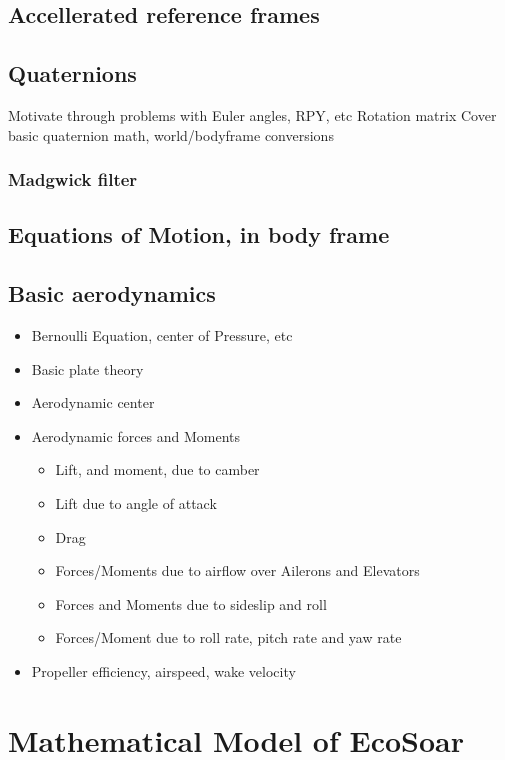 \documentclass{article}
\begin{document}
\subsection{Accellerated reference frames}
\subsection{Quaternions}
Motivate through problems with Euler angles, RPY, etc
Rotation matrix
Cover basic quaternion math,
world/bodyframe conversions
\subsubsection{Madgwick filter}
\subsection{Equations of Motion, in body frame}


\subsection {Basic aerodynamics}

\begin{itemize}
        \item Bernoulli Equation, center of Pressure, etc
        \item Basic plate theory
        \item Aerodynamic center    
        \item Aerodynamic forces and Moments
        \begin{itemize}
            \item Lift, and moment, due to camber
            \item Lift due to angle of attack
            \item Drag
            \item Forces/Moments due to airflow over Ailerons and Elevators
            \item Forces and Moments due to sideslip and roll
            \item Forces/Moment due to roll rate, pitch rate and yaw rate
        \end{itemize}
        \item Propeller efficiency, airspeed, wake velocity
    \end{itemize}

\section{Mathematical Model of EcoSoar}
\end{document}
